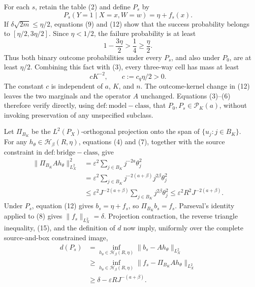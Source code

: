 For each \(s\), retain the table (2) and define \(P_s\) by
\[
 P_s(Y=1\mid X=x,W=w)=\eta+f_s(x).
 \tag{12}
\]
If \(\delta\sqrt{2m}\leq\eta/2\), equations (9) and (12) show that the success probability belongs to \([\eta/2,3\eta/2]\).  Since \(\eta<1/2\), the failure probability is at least
\[
 1-\frac{3\eta}{2}>\frac14\geq\frac\eta2.
 \tag{13}
\]
Thus both binary outcome probabilities under every \(P_s\), and also under \(P_0\), are at least \(\eta/2\).  Combining this fact with (3), every three-way cell has mass at least
\[
 cK^{-2},
 \qquad
 c:=c_q\eta/2>0.
 \tag{14}
\]
The constant \(c\) is independent of \(a\), \(K\), and \(n\).  The outcome-kernel change in (12) leaves the two marginals and the operator \(A\) unchanged.  Equations (3)--(6) therefore verify directly, using \(\mathrm{def:model-class}\), that \(P_0,P_s\in\mathcal P_K(a)\), without invoking preservation of any unspecified subclass.

Let \(\Pi_{B_K}\) be the \(L^2(P_X)\)-orthogonal projection onto the span of \(\{u_j:j\in B_K\}\).  For any \(h_\theta\in\mathcal H_\beta(R,\eta)\), equations (4) and (7), together with the source constraint in \(\mathrm{def:bridge-class}\), give
\[
 \begin{aligned}
 \|\Pi_{B_K}Ah_\theta\|_{L^2_X}^2
 &=\varepsilon^2\sum_{j\in B_K}j^{-2a}\theta_j^2 \\
 &=\varepsilon^2\sum_{j\in B_K}j^{-2(a+\beta)}j^{2\beta}\theta_j^2 \\
 &\leq\varepsilon^2J^{-2(a+\beta)}
       \sum_{j\in B_K}j^{2\beta}\theta_j^2
 \leq\varepsilon^2R^2J^{-2(a+\beta)}.
 \end{aligned}
 \tag{15}
\]
Under \(P_s\), equation (12) gives \(b_s=\eta+f_s\), so \(\Pi_{B_K}b_s=f_s\).  Parseval's identity applied to (8) gives \(\|f_s\|_{L^2_X}=\delta\).  Projection contraction, the reverse triangle inequality, (15), and the definition of \(d\) now imply, uniformly over the complete source-and-box constrained image,
\[
 \begin{aligned}
 d(P_s)
 &=\inf_{h_\theta\in\mathcal H_\beta(R,\eta)}
     \|b_s-Ah_\theta\|_{L^2_X} \\
 &\geq\inf_{h_\theta\in\mathcal H_\beta(R,\eta)}
     \|f_s-\Pi_{B_K}Ah_\theta\|_{L^2_X} \\
 &\geq\delta-\varepsilon RJ^{-(a+\beta)}.
 \end{aligned}
 \tag{16}
\]

